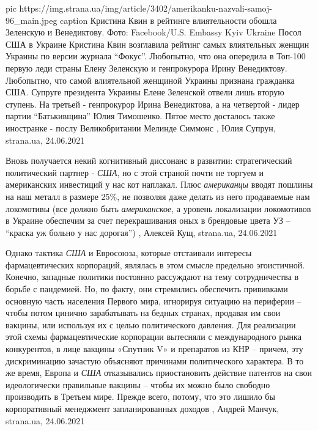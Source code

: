 \ifcmt
  pic https://img.strana.ua/img/article/3402/amerikanku-nazvali-samoj-96_main.jpeg
	caption Кристина Квин в рейтинге влиятельности обошла Зеленскую и Венедиктову. Фото: Facebook/U.S. Embassy Kyiv Ukraine 
\fi
Посол США в Украине Кристина Квин возглавила рейтинг самых влиятельных женщин
Украины по версии журнала \enquote{Фокус}. Любопытно, что она опередила в Топ-100
первую леди страны Елену Зеленскую и генпрокурора Ирину Венедиктову.
Любопытно, что самой влиятельной женщиной Украины признана гражданка США.
Супруге президента  Украины Елене Зеленской отвели лишь вторую ступень.  На
третьей - генпрокурор Ирина Венедиктова, а на четвертой - лидер партии
\enquote{Батькивщина} Юлия Тимошенко. Пятое место досталось также иностранке - послу
Великобритании Мелинде Симмонс
 , Юлия Супрун, strana.ua, 24.06.2021

Вновь получается некий когнитивный диссонанс в развитии: стратегический
политический партнер - \emph{США}, но с этой страной почти не торгуем и американских
инвестиций у нас кот наплакал.  Плюс \emph{американцы} вводят пошлины на наш металл в
размере 25\%, не позволяя даже делать из него продаваемые нам локомотивы (все
должно быть \emph{американское}, а уровень локализации локомотивов в Украине обеспечим
за счет перекрашивания оных в брендовые цвета УЗ – \enquote{краска уж больно у нас
дорогая})
,
Алексей Кущ, strana.ua, 24.06.2021

Однако тактика \emph{США} и Евросоюза, которые отстаивали интересы фармацевтических
корпораций, являлась в этом смысле предельно эгоистичной. Конечно, западные
политики постоянно рассуждают на тему сотрудничества в борьбе с пандемией. Но,
по факту, они стремились обеспечить прививками основную часть населения Первого
мира, игнорируя ситуацию на периферии – чтобы потом цинично зарабатывать на
бедных странах, продавая им свои вакцины, или используя их с целью
политического давления.  Для реализации этой схемы фармацевтические корпорации
вытесняли с международного рынка конкурентов, в лице вакцины «Спутник V» и
препаратов из КНР – причем, эту дискриминацию зачастую объясняют причинами
политического характера. В то же время, Европа и \emph{США} отказывались приостановить
действие патентов на свои идеологически правильные вакцины – чтобы их можно
было свободно производить в Третьем мире. Прежде всего, потому, что это лишило
бы корпоративный менеджмент запланированных доходов
, 
Андрей Манчук, strana.ua, 24.06.2021

